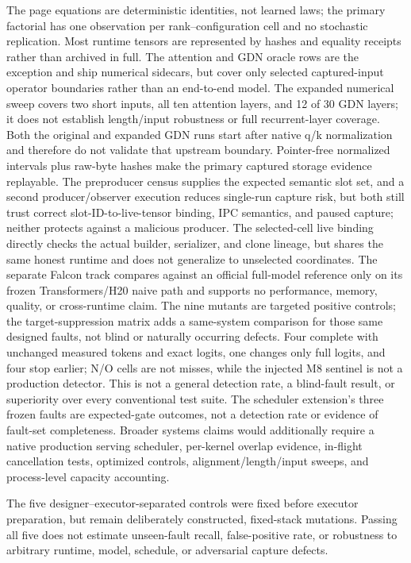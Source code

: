 \documentclass{article}
\begin{document}
The page equations are deterministic identities, not learned laws; the primary
factorial has one observation per rank--configuration cell and no stochastic
replication. Most runtime tensors are represented by hashes and equality
receipts rather than archived in full. The attention and GDN oracle rows are
the exception and ship numerical sidecars, but cover only selected
captured-input operator boundaries rather than an end-to-end model. The
expanded numerical sweep covers two short inputs, all ten attention layers,
and 12 of 30 GDN layers; it does not establish length/input robustness or full
recurrent-layer coverage. Both the original and expanded GDN runs start after
native q/k normalization and therefore do not validate that upstream boundary.
Pointer-free normalized intervals plus raw-byte hashes make the primary
captured storage evidence replayable. The preproducer census supplies the
expected semantic slot set, and a second producer/observer execution reduces
single-run capture risk, but both still trust correct slot-ID-to-live-tensor
binding, IPC semantics, and paused capture; neither protects against a
malicious producer. The selected-cell live binding directly checks the actual
builder, serializer, and clone lineage, but shares the same honest runtime and
does not generalize to unselected coordinates. The separate Falcon track
compares against an official full-model reference only on its frozen
Transformers/H20 naive path and supports no performance, memory, quality, or
cross-runtime claim. The nine mutants are targeted positive controls; the
target-suppression matrix adds a same-system comparison for those same
designed faults, not blind or naturally occurring defects. Four complete with
unchanged measured tokens and exact logits, one changes only full logits, and
four stop earlier; N/O cells are not misses, while the injected M8 sentinel is
not a production detector. This is not a general detection rate, a blind-fault
result, or superiority over every conventional test suite. The scheduler
extension's three frozen faults are expected-gate outcomes, not a detection
rate or evidence of fault-set completeness. Broader systems claims would
additionally require a native production serving scheduler, per-kernel overlap
evidence, in-flight cancellation tests, optimized controls,
alignment/length/input sweeps, and process-level capacity accounting.

The five designer--executor-separated controls were fixed before executor
preparation, but remain deliberately constructed, fixed-stack mutations.
Passing all five does not estimate unseen-fault recall, false-positive rate,
or robustness to arbitrary runtime, model, schedule, or adversarial capture
defects.
\end{document}
